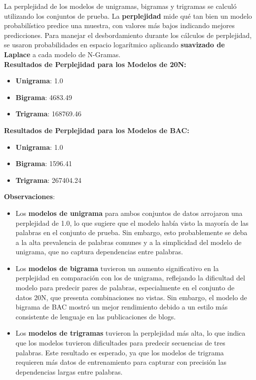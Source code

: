 \documentclass[11pt,english]{article}
\theoremstyle{plain}
\begin{document}
La perplejidad de los modelos de unigramas, bigramas y trigramas se calculó utilizando los conjuntos de prueba. La \textbf{perplejidad} mide qué tan bien un modelo probabilístico predice una muestra, con valores más bajos indicando mejores predicciones. Para manejar el desbordamiento durante los cálculos de perplejidad, se usaron probabilidades en espacio logarítmico aplicando \textbf{suavizado de Laplace} a cada modelo de N-Gramas.\\

\textbf{Resultados de Perplejidad para los Modelos de 20N:}
\begin{itemize}
    \item \textbf{Unigrama}: 1.0
    \item \textbf{Bigrama}: 4683.49
    \item \textbf{Trigrama}: 168769.46
\end{itemize}

\textbf{Resultados de Perplejidad para los Modelos de BAC:}
\begin{itemize}
    \item \textbf{Unigrama}: 1.0
    \item \textbf{Bigrama}: 1596.41
    \item \textbf{Trigrama}: 267404.24
\end{itemize}

\textbf{Observaciones}:
\begin{itemize}
    \item Los \textbf{modelos de unigrama} para ambos conjuntos de datos arrojaron una perplejidad de 1.0, lo que sugiere que el modelo había visto la mayoría de las palabras en el conjunto de prueba. Sin embargo, esto probablemente se deba a la alta prevalencia de palabras comunes y a la simplicidad del modelo de unigrama, que no captura dependencias entre palabras.
    \item Los \textbf{modelos de bigrama} tuvieron un aumento significativo en la perplejidad en comparación con los de unigrama, reflejando la dificultad del modelo para predecir pares de palabras, especialmente en el conjunto de datos 20N, que presenta combinaciones no vistas. Sin embargo, el modelo de bigrama de BAC mostró un mejor rendimiento debido a un estilo más consistente de lenguaje en las publicaciones de blogs.
    \item Los \textbf{modelos de trigramas} tuvieron la perplejidad más alta, lo que indica que los modelos tuvieron dificultades para predecir secuencias de tres palabras. Este resultado es esperado, ya que los modelos de trigrama requieren más datos de entrenamiento para capturar con precisión las dependencias largas entre palabras.
\end{itemize}
\end{document}
